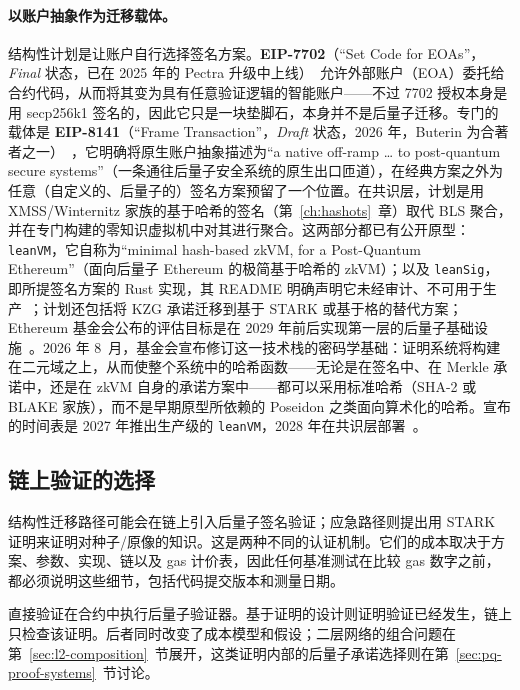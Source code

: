 \paragraph{以账户抽象作为迁移载体。}
结构性计划是让账户自行选择签名方案。\textbf{EIP-7702}（“Set Code for EOAs”，\emph{Final} 状态，已在 2025 年的 Pectra 升级中上线）~\cite{eip7702}允许外部账户（EOA）委托给合约代码，从而将其变为具有任意验证逻辑的智能账户——不过 7702 授权本身是用 secp256k1 签名的，因此它只是一块垫脚石，本身并不是后量子迁移。专门的载体是 \textbf{EIP-8141}（“Frame Transaction”，\emph{Draft} 状态，2026 年，Buterin 为合著者之一）~\cite{eip8141}，它明确将原生账户抽象描述为“a native off-ramp \dots{} to post-quantum secure systems”（一条通往后量子安全系统的原生出口匝道），在经典方案之外为任意（自定义的、后量子的）签名方案预留了一个位置。在共识层，计划是用 XMSS/Winternitz 家族的基于哈希的签名（第~\ref{ch:hashots}~章）取代 BLS 聚合，并在专门构建的零知识虚拟机中对其进行聚合。这两部分都已有公开原型：\texttt{leanVM}，它自称为“minimal hash-based zkVM, for a Post-Quantum Ethereum”（面向后量子 Ethereum 的极简基于哈希的 zkVM）；以及 \texttt{leanSig}，即所提签名方案的 Rust 实现，其 README 明确声明它未经审计、不可用于生产~\cite{leanvm}；计划还包括将 KZG 承诺迁移到基于 STARK 或基于格的替代方案；Ethereum 基金会公布的评估目标是在 2029 年前后实现第一层的后量子基础设施~\cite{ethpqroadmap}。2026 年 8~月，基金会宣布修订这一技术栈的密码学基础：证明系统将构建在二元域之上，从而使整个系统中的哈希函数——无论是在签名中、在 Merkle 承诺中，还是在 zkVM 自身的承诺方案中——都可以采用标准哈希（SHA-2 或 BLAKE 家族），而不是早期原型所依赖的 Poseidon 之类面向算术化的哈希。宣布的时间表是 2027 年推出生产级的 \texttt{leanVM}，2028 年在共识层部署~\cite{efbinary2026}。

\subsection{链上验证的选择}
\label{sec:onchain}
结构性迁移路径可能会在链上引入后量子签名验证；应急路径则提出用 STARK 证明来证明对种子/原像的知识。这是两种不同的认证机制。它们的成本取决于方案、参数、实现、链以及 gas 计价表，因此任何基准测试在比较 gas 数字之前，都必须说明这些细节，包括代码提交版本和测量日期。

直接验证在合约中执行后量子验证器。基于证明的设计则证明验证已经发生，链上只检查该证明。后者同时改变了成本模型和假设；二层网络的组合问题在第~\ref{sec:l2-composition}~节展开，这类证明内部的后量子承诺选择则在第~\ref{sec:pq-proof-systems}~节讨论。

